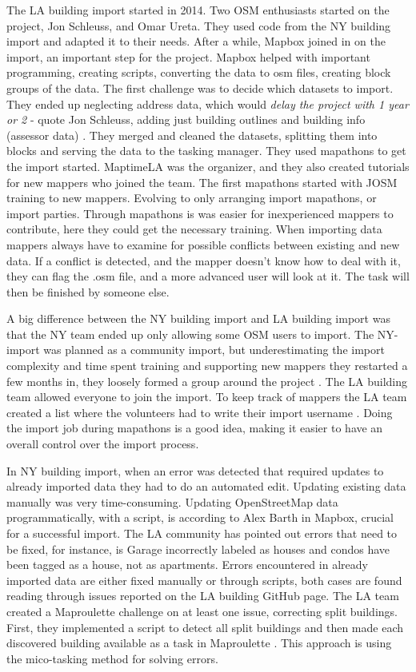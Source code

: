 The LA building import started in 2014. Two OSM enthusiasts started on the project, Jon Schleuss, and Omar Ureta. They used code from the NY building import and adapted it to their needs. After a while, Mapbox joined in on the import, an important step for the project. Mapbox helped with important programming, creating scripts, converting the data to osm files, creating block groups of the data. The first challenge was to decide which datasets to import.  They ended up neglecting address data, which would \textit{delay the project with 1 year or 2} - quote Jon Schleuss, adding just building outlines and building info (assessor data) \cite{Schleuss2016}. They merged and cleaned the datasets, splitting them into blocks and serving the data to the tasking manager. They used mapathons to get the import started. MaptimeLA was the organizer, and they also created tutorials for new mappers who joined the team. The first mapathons started with JOSM training to new mappers. Evolving to only arranging import mapathons, or import parties. Through mapathons is was easier for inexperienced mappers to contribute, here they could get the necessary training.  When importing data mappers always have to examine for possible conflicts between existing and new data. If a conflict is detected, and the mapper doesn't know how to deal with it, they can flag the .osm file, and a more advanced user will look at it. The task will then be finished by someone else. 

A big difference between the NY building import and LA building import was that the NY team ended up only allowing some OSM users to import. The NY-import was planned as a community import, but underestimating the import complexity and time spent training and supporting new mappers they restarted a few months in,  they loosely formed a group around the project \cite{Barth2014}. The LA building team allowed everyone to join the import. To keep track of mappers the LA team created a list where the volunteers had to write their import username \cite{Sambale2016s}. Doing the import job during mapathons is a good idea, making it easier to have an overall control over the import process. 

In NY building import, when an error was detected that required updates to already imported data they had to do an automated edit. Updating existing data manually was very time-consuming. Updating OpenStreetMap data programmatically, with a script, is according to Alex Barth in Mapbox, crucial for a successful import.  The LA community has pointed out errors that need to be fixed, for instance, is Garage incorrectly labeled as houses and condos have been tagged as a house, not as apartments. Errors encountered in already imported data are either fixed manually or through scripts, both cases are found reading through issues reported on the LA building GitHub page. The LA team created a Maproulette challenge on at least one issue, correcting split buildings. First, they implemented a script to detect all split buildings and then made each discovered building available as a task in Maproulette \cite{Sambale2016a}. This approach is using the mico-tasking method for solving errors.  

